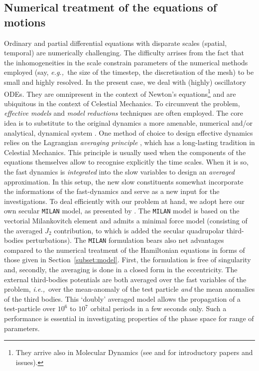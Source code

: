 \documentclass{amsart}
\theoremstyle{definition}
\theoremstyle{remark}
\numberwithin{equation}{section}
\newcommand{\ie}{\textit{i.e.,\ }}
\newcommand{\eg}{\textit{e.g.,\ }}
\begin{document}
\subsection{Numerical treatment of the equations of motions}\label{SubSec:EDOs}
Ordinary and partial differential equations with disparate scales (spatial, temporal)  are numerically challenging. The difficulty arrises from the fact that the inhomogeneities in the scale constrain parameters of the numerical methods employed (say, \eg the size of the timestep, the discretisation of the mesh)  to be small and highly resolved. 
In the present case, we deal with (highly) oscillatory ODEs. They are omnipresent in the context of Newton's equations\footnote{{\color{black}They arrive also in Molecular Dynamics (see \cite{mAl04} and \cite{gAr98} for introductory papers and issues).}} and are ubiquitous in the context of Celestial Mechanics.
To circumvent the problem, \textit{effective models} and \textit{model reductions} techniques are often employed. The core idea is to substitute to the original dynamics a more amenable, numerical and/or analytical, dynamical system \citep{dGi04,aLe06,cHa07}.  
One method of choice to design effective dynamics relies on the Lagrangian \textit{averaging principle} \citep{eGr65,iMi67,eGh07,gPa08}, which has a long-lasting tradition in Celestial Mechanics.  
This principle is usually used when the components of the equations themselves allow to recognise explicitly the time scales. When it is so, the fast dynamics is \textit{integrated} into the slow variables to design an \textit{averaged} approximation.  In this setup, the new slow constituents somewhat incorporate the informations of the fast-dynamics and serve as a new input for the investigations.  
To deal efficiently with our problem at hand, we adopt here our own secular \texttt{MILAN} model, as presented by \cite{iGk16}. The \texttt{MILAN} model is based on the vectorial Milankovitch element and admits a minimal force model (consisting of the averaged $J_{2}$ contribution, to which is added the secular quadrupolar third-bodies perturbations). The \texttt{MILAN} formulation bears also net advantages compared to the numerical treatment of the Hamiltonian equations in forms of those given in Section~\ref{subset:model}. First, the formulation is free of singularity and, secondly, the averaging  is done in a closed form in the eccentricity.
The external third-bodies potentials are both averaged over the fast variables of the problem, \ie over 
the mean-anomaly of the test particle \textit{and} the mean anomalies of the third bodies. This `doubly' averaged model {\color{black} allows} the propagation of a test-particle over $10^{6}$ to $10^{7}$ orbital periods in a few seconds only. Such a performance is essential in investigating properties of the phase space for range of parameters.  
\end{document}
